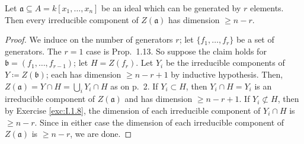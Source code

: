 \documentclass[10pt]{article}
\theoremstyle{definition}
\theoremstyle{remark}
\numberwithin{equation}{section}
\numberwithin{figure}{subsubsection}
\begin{document}
\begin{problem}
  Let $\mathfrak{a} \subseteq A = k[x_1,\ldots,x_n]$ be an ideal which can be
  generated by $r$ elements.
  Then every irreducible component of $Z(\mathfrak{a})$ has dimension $\ge n-r$.
\end{problem}
\begin{proof}
  We induce on the number of generators $r$; let $\{f_1,\ldots,f_r\}$ be
  a set of generators.
  The $r=1$ case is Prop.~1.13.
  So suppose the claim holds for $\mathfrak{b} = (f_1,\ldots,f_{r-1})$; let $H = Z(f_r)$.
  Let $Y_i$ be the irreducible components of $Y \coloneqq Z(\mathfrak{b})$; each has
  dimension $\ge n-r+1$ by inductive hypothesis.
  Then, $Z(\mathfrak{a}) = Y \cap H = \bigcup_i Y_i \cap H$ as on p.~2.
  If $Y_i \subset H$, then $Y_i \cap H = Y_i$ is an irreducible component of
  $Z(\mathfrak{a})$ and has dimension $\ge n-r+1$.
  If $Y_i \not\subset H$, then by Exercise \ref{exc:I.1.8}, the dimension of each
  irreducible component of $Y_i \cap H$ is $\ge n-r$. 
  Since in either case the dimension of each irreducible component of
  $Z(\mathfrak{a})$ is $\ge n-r$, we are done.
\end{proof}
\end{document}

